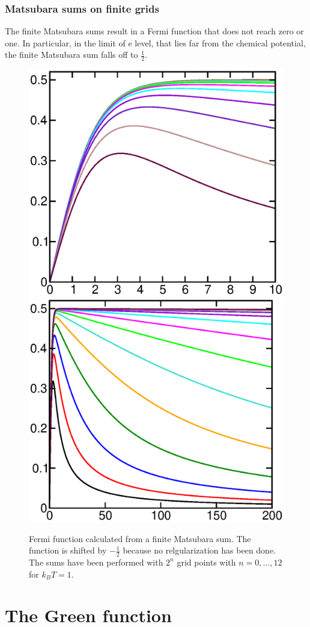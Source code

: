 \documentclass[11pt,a4paper]{report}
\begin{document}
\subsection{Matsubara sums on finite grids}
The finite Matsubara sums result in a Fermi function that does not
reach zero or one. In particular, in the limit of e level, that lies
far from the chemical potential, the finite Matsubara sum falls off to
$\frac{1}{2}$.

\begin{figure}[h!]
\begin{center}
\includegraphics[width=0.4\linewidth,clip=true]
{Figs/Xmgrace/FiniteMatsubara/gsumlow.eps}
\includegraphics[width=0.4\linewidth,clip=true]
{Figs/Xmgrace/FiniteMatsubara/gsumhigh.eps}
\end{center}
\caption{\label{fig:finfitematsubara} Fermi function calculated from a
  finite Matsubara sum. The function is shifted by $-\frac{1}{2}$
  because no relgularization has been done. The sums have been
  performed with $2^n$ grid points with $n=0,\ldots,12$ for $k_BT=1.$}
\end{figure}



\chapter{The Green function}
\end{document}
